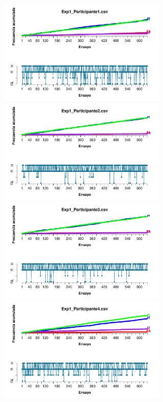 \documentclass[a4paper ]{article}
\begin{document}
\begin{figure}[th]
\centering
\includegraphics[width=9cm, height=5cm]{Figures/Outcome_Exp1_P1} \includegraphics[width=9cm, height=5cm]{Figures/Outcome_Exp1_P2} 
\includegraphics[width=9cm, height=5cm]{Figures/Outcome_Exp1_P3} \includegraphics[width=9cm, height=5cm]{Figures/Outcome_Exp1_P4} 

\end{figure}
\end{document}
